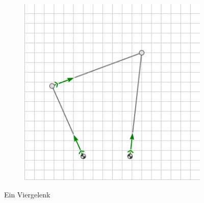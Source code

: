 \begin{figure}[H]
\begin{subfigure}[b]{0.3\textwidth}
        \includegraphics[width=\textwidth]{images/4bar_prediction.png}
        \caption{}
        \label{fig:4bar_prediction}
    \end{subfigure}
    \label{fig:4bar_example}
    \caption{Ein Viergelenk}
\end{figure}

